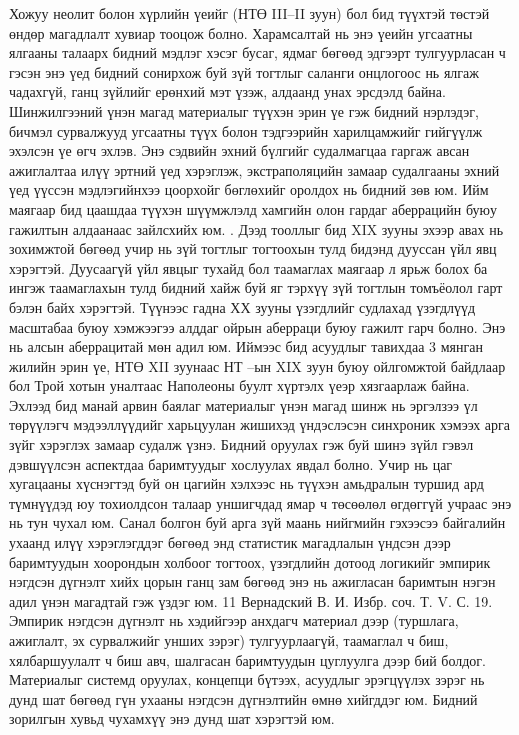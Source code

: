 Хожуу неолит болон хүрлийн үеийг (НТӨ III–II зуун) бол бид түүхтэй төстэй өндөр магадлалт хувиар тооцож болно. Харамсалтай нь энэ үеийн угсаатны ялгааны талаарх бидний мэдлэг хэсэг бусаг, ядмаг бөгөөд эдгээрт тулгуурласан ч гэсэн энэ үед бидний сонирхож буй зүй тогтлыг саланги онцлогоос нь ялгаж чадахгүй, ганц зүйлийг ерөнхий мэт үзэж, алдаанд унах эрсдэлд байна.
Шинжилгээний үнэн магад материалыг түүхэн эрин үе гэж бидний нэрлэдэг, бичмэл сурвалжууд угсаатны түүх болон тэдгээрийн харилцамжийг гийгүүлж эхэлсэн үе өгч эхлэв. Энэ сэдвийн эхний бүлгийг судалмагцаа гаргаж авсан ажиглалтаа илүү эртний үед хэрэглэж, экстраполяцийн замаар судалгааны эхний үед үүссэн мэдлэгийнхээ цоорхойг бөглөхийг оролдох нь бидний зөв юм. Ийм маягаар бид цаашдаа түүхэн шүүмжлэлд хамгийн олон гардаг аберрацийн буюу гажилтын алдаанаас зайлсхийх юм. .
Дээд тооллыг бид XIX зууны эхээр авах нь зохимжтой бөгөөд учир нь зүй тогтлыг тогтоохын тулд бидэнд дууссан үйл явц хэрэгтэй. Дуусаагүй үйл явцыг тухайд бол таамаглах маягаар л ярьж болох ба ингэж таамаглахын тулд бидний хайж буй яг тэрхүү зүй тогтлын томъёолол гарт бэлэн байх хэрэгтэй. Түүнээс гадна ХХ зууны үзэгдлийг судлахад үзэгдлүүд масштабаа буюу хэмжээгээ алддаг ойрын аберраци буюу гажилт гарч болно. Энэ нь алсын аберрацитай мөн адил юм. Иймээс бид асуудлыг тавихдаа 3 мянган жилийн эрин үе, НТӨ XII зуунаас НТ –ын XIX зуун буюу ойлгомжтой байдлаар бол Трой хотын уналтаас Наполеоны буулт хүртэлх үеэр хязгаарлаж байна.
Эхлээд бид манай арвин баялаг материалыг үнэн магад шинж нь эргэлзээ үл төрүүлэгч мэдээллүүдийг харьцуулан жишихэд үндэслэсэн синхроник хэмээх арга зүйг хэрэглэх замаар судалж үзнэ. Бидний оруулах гэж буй шинэ зүйл гэвэл дэвшүүлсэн аспектдаа баримтуудыг хослуулах явдал болно. Учир нь цаг хугацааны хүснэгтэд буй он цагийн хэлхээс нь түүхэн амьдралын туршид ард түмнүүдэд юу тохиолдсон талаар уншигчдад ямар ч төсөөлөл өгдөггүй учраас энэ нь тун чухал юм. Санал болгон буй арга зүй маань нийгмийн гэхээсээ байгалийн ухаанд илүү хэрэглэгддэг бөгөөд энд статистик магадлалын үндсэн дээр баримтуудын хоорондын холбоог тогтоох, үзэгдлийн дотоод логикийг эмпирик нэгдсэн дүгнэлт хийх цорын ганц зам бөгөөд энэ нь ажигласан баримтын нэгэн адил үнэн магадтай гэж үздэг юм.
11 Вернадский В. И. Избр. соч. Т. V. С. 19.
Эмпирик нэгдсэн дүгнэлт нь хэдийгээр анхдагч материал дээр (туршлага, ажиглалт, эх сурвалжийг унших зэрэг) тулгуурлаагүй, таамаглал ч биш, хялбаршуулалт ч биш авч, шалгасан баримтуудын цуглуулга дээр бий болдог. Материалыг системд оруулах, концепци бүтээх, асуудлыг эрэгцүүлэх зэрэг нь дунд шат бөгөөд гүн ухааны нэгдсэн дүгнэлтийн өмнө хийгддэг юм. Бидний зорилгын хувьд чухамхүү энэ дунд шат хэрэгтэй юм.
